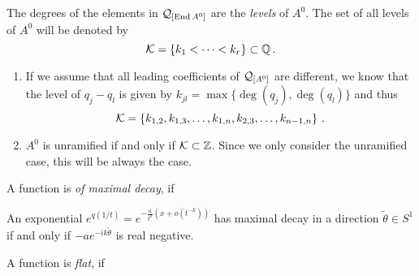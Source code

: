\begin{defn}
\begin{s-rem}
\begin{enumerate}
    \end{enumerate}
  \end{s-rem}
  The degrees of the elements in $\mathcal{Q}_{[\operatorname{End} A^0]}$ are the
  \emph{levels} of $A^0$.
  The set of all levels of $A^0$ will be denoted by
  \[
    \mathcal{K}=\{k_1<\dots<k_r\} \subset \mathbb{Q} \,.
  \]
  \begin{s-rem}
    \begin{enumerate}
      \item If we assume that all leading coefficients of $\mathcal{Q}_{[A^0]}$ are
        different, we know that the level of $q_j-q_l$ is given by
        $k_{jl}=\max\{\deg(q_j),\deg(q_l)\}$ and thus
        \[
          \mathcal{K}=\left\{
            k_{1,2},
            k_{1,3},\dots,
            k_{1,n},
            k_{2,3},\dots,
            k_{n-1,n}
          \right\}\,.
        \]
      \item $A^0$ is unramified if and only if $\mathcal{K}\subset\mathbb{Z}$. Since we only
        consider the unramified case, this will be always the case.
    \end{enumerate}
  \end{s-rem}
\end{defn}

\begin{defn}
  \begin{comment}
    See \cite{hotta2008}, \cite[79]{Loday2014}
  \end{comment}
  A function is \emph{of maximal decay}, if \TODO{}
  \begin{s-rem}
    An exponential $e^{q(1/t)}=e^{-\frac{a}{t^{k}}(x+o(t^{-k}))}$ has maximal
    decay in a direction $\tilde\theta\in S^1$ if and only if
    $-ae^{-ik\tilde\theta}$ is real negative.
  \end{s-rem}

  A function is \emph{flat}, if \TODO{}
\end{defn}

